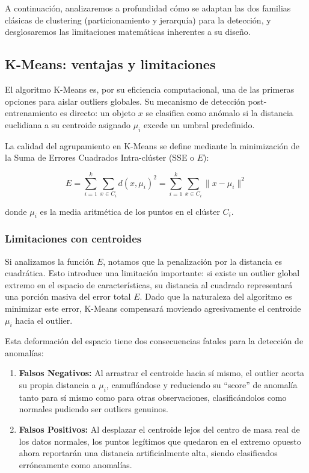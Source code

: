 A continuación, analizaremos a profundidad cómo se adaptan las dos familias clásicas de clustering (particionamiento y jerarquía) para la detección, y desglosaremos las limitaciones matemáticas inherentes a su diseño.

\subsection{K-Means: ventajas y limitaciones}

El algoritmo K-Means es, por su eficiencia computacional, una de las primeras opciones para aislar outliers globales. Su mecanismo de detección post-entrenamiento es directo: un objeto $x$ se clasifica como anómalo si la distancia euclidiana a su centroide asignado $\mu_i$ excede un umbral predefinido.

La calidad del agrupamiento en K-Means se define mediante la minimización de la Suma de Errores Cuadrados Intra-clúster (SSE o $E$):

\[
E = \sum_{i=1}^{k} \sum_{x \in C_i} d(x, \mu_i)^2
=
\sum_{i=1}^{k} \sum_{x \in C_i} \|x - \mu_i\|^2
\]

donde $\mu_i$ es la media aritmética de los puntos en el clúster $C_i$.

\subsubsection{Limitaciones con centroides}

Si analizamos la función $E$, notamos que la penalización por la distancia es cuadrática. Esto introduce una limitación importante: si existe un outlier global extremo en el espacio de características, su distancia al cuadrado representará una porción masiva del error total $E$. Dado que la naturaleza del algoritmo es minimizar este error, K-Means compensará moviendo agresivamente el centroide $\mu_i$ hacia el outlier.

Esta deformación del espacio tiene dos consecuencias fatales para la detección de anomalías:

\begin{enumerate}
	\item \textbf{Falsos Negativos:} Al arrastrar el centroide hacia sí mismo, el outlier acorta su propia distancia a $\mu_i$, camuflándose y reduciendo su ``score'' de anomalía tanto para sí mismo como para otras observaciones, clasificándolos como normales pudiendo ser outliers genuinos.
	
	\item \textbf{Falsos Positivos:} Al desplazar el centroide lejos del centro de masa real de los datos normales, los puntos legítimos que quedaron en el extremo opuesto ahora reportarán una distancia artificialmente alta, siendo clasificados erróneamente como anomalías.
\end{enumerate}

